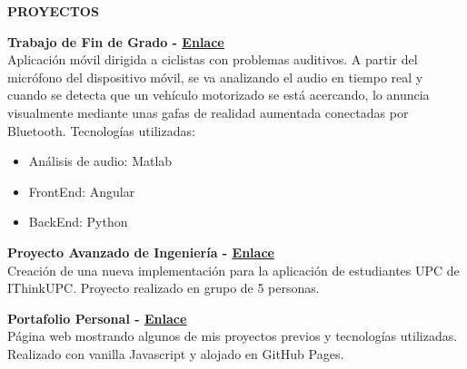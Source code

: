 \documentclass[../main.tex]{subfiles}
\begin{document}
    \textbf{\textcolor{myCV2}{PROYECTOS\underline{\hspace{15.43cm}}}}
    \vspace*{0.3cm}
    
    \textbf{Trabajo de Fin de Grado - 
        \hspace*{0.07cm}
        \textcolor{myCV2}{
        \vspace*{0.1cm}\underline{\href{https://www.youtube.com/watch?v=WKyUsdZbQ0Y}{Enlace}}}}\\
        Aplicación móvil dirigida a ciclistas con problemas auditivos. A partir del micrófono del dispositivo móvil, se va analizando el audio en tiempo real y cuando se detecta que un vehículo motorizado se está acercando, lo anuncia visualmente mediante unas gafas de realidad aumentada conectadas por Bluetooth. Tecnologías utilizadas:
        \begin{itemize}
            \vspace*{-0.2cm}
            \item Análisis de audio: Matlab
            \vspace*{-0.2cm}
            \item FrontEnd: Angular
            \vspace*{-0.2cm}
            \item BackEnd: Python
        \end {itemize}
        
        \textbf{Proyecto Avanzado de Ingeniería - 
         \hspace*{0.07cm}
         \textcolor{myCV2}{
        \vspace*{0.1cm}\underline{\href{https://www.youtube.com/watch?v=RrfiOulhY-E&t=7s}{Enlace}}}}\\
        Creación de una nueva implementación para la aplicación de estudiantes UPC de IThinkUPC. Proyecto realizado en grupo de 5 personas.

        \vspace*{0.25cm}
        \textbf{Portafolio Personal - 
         \hspace*{0.07cm}
         \textcolor{myCV2}{
        \vspace*{0.1cm}\underline{\href{https://albatalaya.github.io/}{Enlace}}}}\\
        Página web mostrando algunos de mis proyectos previos y tecnologías utilizadas. Realizado con vanilla Javascript y alojado en GitHub Pages.

        
\end{document}
